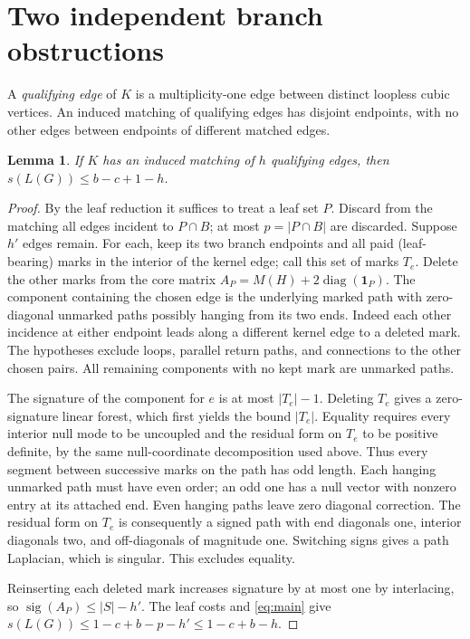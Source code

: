 \documentclass[11pt]{article}
\newtheorem{lemma}[theorem]{Lemma}
\newcommand{\sg}{\operatorname{sig}}
\newcommand{\diag}{\operatorname{diag}}
\begin{document}
\section{Two independent branch obstructions}
A \emph{qualifying edge} of $K$ is a multiplicity-one edge between distinct loopless cubic vertices. An induced matching of qualifying edges has disjoint endpoints, with no other edges between endpoints of different matched edges.
\begin{lemma}\label{lem:matching}
If $K$ has an induced matching of $h$ qualifying edges, then $s(L(G))\le b-c+1-h$.
\end{lemma}
\begin{proof}
By the leaf reduction it suffices to treat a leaf set $P$. Discard from the matching all edges incident to $P\cap B$; at most $p=|P\cap B|$ are discarded. Suppose $h'$ edges remain. For each, keep its two branch endpoints and all paid (leaf-bearing) marks in the interior of the kernel edge; call this set of marks $T_e$. Delete the other marks from the core matrix $A_P=M(H)+2\diag(\mathbf1_P)$. The component containing the chosen edge is the underlying marked path with zero-diagonal unmarked paths possibly hanging from its two ends. Indeed each other incidence at either endpoint leads along a different kernel edge to a deleted mark. The hypotheses exclude loops, parallel return paths, and connections to the other chosen pairs. All remaining components with no kept mark are unmarked paths.

The signature of the component for $e$ is at most $|T_e|-1$. Deleting $T_e$ gives a zero-signature linear forest, which first yields the bound $|T_e|$. Equality requires every interior null mode to be uncoupled and the residual form on $T_e$ to be positive definite, by the same null-coordinate decomposition used above. Thus every segment between successive marks on the path has odd length. Each hanging unmarked path must have even order; an odd one has a null vector with nonzero entry at its attached end. Even hanging paths leave zero diagonal correction. The residual form on $T_e$ is consequently a signed path with end diagonals one, interior diagonals two, and off-diagonals of magnitude one. Switching signs gives a path Laplacian, which is singular. This excludes equality.

Reinserting each deleted mark increases signature by at most one by interlacing, so $\sg(A_P)\le |S|-h'$. The leaf costs and \eqref{eq:main} give $s(L(G))\le1-c+b-p-h'\le1-c+b-h$.
\end{proof}
\end{document}
